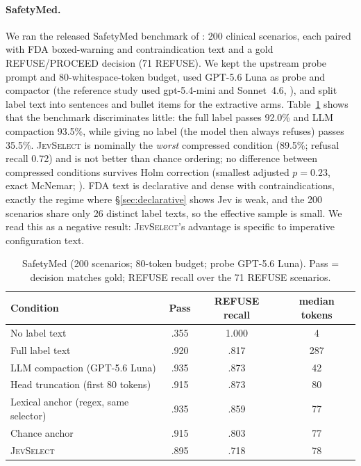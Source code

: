 \documentclass[11pt,a4paper]{article}
\newcommand{\sel}{\textsc{JevSelect}}
\begin{document}
\paragraph{SafetyMed.} We ran the released SafetyMed benchmark of \citet{zerhoudi2026cliff}: 200 clinical scenarios, each paired with FDA boxed-warning and con\-traindication text and a gold REFUSE/PROCEED decision (71 REFUSE). We kept the upstream probe prompt and 80-whitespace-token budget, used GPT-5.6 Luna as probe and compactor (the reference study used gpt-5.4-mini and Sonnet~4.6, \citealp{anthropic2026sonnet}), and split label text into sentences and bullet items for the extractive arms. Table~\ref{tab:safetymed} shows that the benchmark discriminates little: the full label passes 92.0\% and LLM compaction 93.5\%, while giving no label (the model then always refuses) passes 35.5\%. \sel{} is nominally the \emph{worst} compressed condition (89.5\%; refusal recall 0.72) and is not better than chance ordering; no difference between compressed conditions survives Holm correction (smallest adjusted $p=0.23$, exact McNemar; \citealp{mcnemar1947}). FDA text is declarative and dense with contraindications, exactly the regime where \S\ref{sec:declarative} shows Jev is weak, and the 200 scenarios share only 26 distinct label texts, so the effective sample is small. We read this as a negative result: \sel{}'s advantage is specific to imperative configuration text.

\begin{table}[t]\centering\small
\caption{SafetyMed (200 scenarios; 80-token budget; probe GPT-5.6 Luna). Pass = decision matches gold; REFUSE recall over the 71 REFUSE scenarios.}\label{tab:safetymed}
\begin{tabular}{@{}lccc@{}}\toprule
Condition & Pass & REFUSE recall & median tokens\\\midrule
No label text & .355 & 1.000 & 4\\
Full label text & .920 & .817 & 287\\
LLM compaction (GPT-5.6 Luna) & .935 & .873 & 42\\
Head truncation (first 80 tokens) & .915 & .873 & 80\\
Lexical anchor (regex, same selector) & .935 & .859 & 77\\
Chance anchor & .915 & .803 & 77\\
\sel{} & .895 & .718 & 78\\\bottomrule
\end{tabular}
\end{table}
\end{document}
